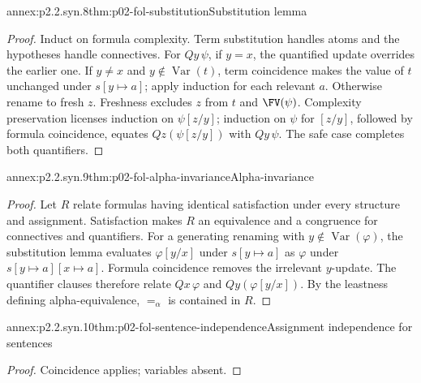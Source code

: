 \begin{annexitem}{annex:p2.2.syn.8}{thm:p02-fol-substitution}{Substitution lemma}
\begin{proof}
Induct on formula complexity.  Term substitution handles atoms and the
hypotheses handle connectives.  For \(Qy\,\psi\), if \(y=x\), the quantified
update overrides the earlier one.  If \(y\ne x\) and
\(y\notin\operatorname{Var}(t)\), term coincidence makes the value of \(t\)
unchanged under \(s[y\mapsto a]\); apply induction for each relevant \(a\).
Otherwise rename to fresh \(z\).  Freshness excludes \(z\) from \(t\) and
\(\FV(\psi)\).  Complexity preservation licenses induction on
\(\psi[z/y]\); induction on \(\psi\) for \([z/y]\), followed by formula
coincidence, equates \(Qz(\psi[z/y])\) with \(Qy\,\psi\).  The safe case
completes both quantifiers.
\end{proof}
\end{annexitem}

\begin{annexitem}{annex:p2.2.syn.9}{thm:p02-fol-alpha-invariance}{Alpha-invariance}
\begin{proof}
Let \(R\) relate formulas having identical satisfaction under every structure
and assignment.  Satisfaction makes \(R\) an equivalence and a congruence for
connectives and quantifiers.  For a generating renaming with
\(y\notin\operatorname{Var}(\varphi)\), the substitution lemma evaluates
\(\varphi[y/x]\) under \(s[y\mapsto a]\) as \(\varphi\) under
\(s[y\mapsto a][x\mapsto a]\).  Formula coincidence removes the irrelevant
\(y\)-update.  The quantifier clauses therefore relate
\(Qx\,\varphi\) and \(Qy(\varphi[y/x])\).  By the leastness defining
alpha-equivalence, \(=_{\alpha}\) is contained in \(R\).
\end{proof}
\end{annexitem}

\begin{annexitem}{annex:p2.2.syn.10}{thm:p02-fol-sentence-independence}{Assignment independence for sentences}
\begin{proof}
Coincidence applies; variables absent.
\end{proof}
\end{annexitem}

